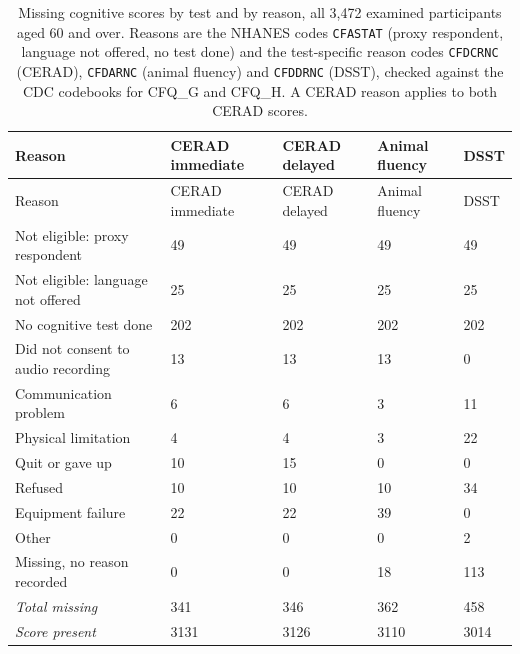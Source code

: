 \documentclass[11pt]{article}
\begin{document}
\begin{longtable}{L{5.9cm}R{1.9cm}R{1.9cm}R{1.9cm}R{1.9cm}}
\caption{Missing cognitive scores by test and by reason, all 3,472 examined participants aged 60 and over. Reasons are the NHANES codes \texttt{CFASTAT} (proxy respondent, language not offered, no test done) and the test-specific reason codes \texttt{CFDCRNC} (CERAD), \texttt{CFDARNC} (animal fluency) and \texttt{CFDDRNC} (DSST), checked against the CDC codebooks for CFQ\_G and CFQ\_H. A CERAD reason applies to both CERAD scores.}\\
\toprule
Reason & CERAD immediate & CERAD delayed & Animal fluency & DSST \\
\midrule
\endfirsthead
\toprule
Reason & CERAD immediate & CERAD delayed & Animal fluency & DSST \\
\midrule
\endhead
\bottomrule
\endlastfoot
Not eligible: proxy respondent & 49 & 49 & 49 & 49 \\
Not eligible: language not offered & 25 & 25 & 25 & 25 \\
No cognitive test done & 202 & 202 & 202 & 202 \\
Did not consent to audio recording & 13 & 13 & 13 & 0 \\
Communication problem & 6 & 6 & 3 & 11 \\
Physical limitation & 4 & 4 & 3 & 22 \\
Quit or gave up & 10 & 15 & 0 & 0 \\
Refused & 10 & 10 & 10 & 34 \\
Equipment failure & 22 & 22 & 39 & 0 \\
Other & 0 & 0 & 0 & 2 \\
Missing, no reason recorded & 0 & 0 & 18 & 113 \\
\textit{Total missing} & 341 & 346 & 362 & 458 \\
\textit{Score present} & 3131 & 3126 & 3110 & 3014 \\
\end{longtable}
\end{document}
